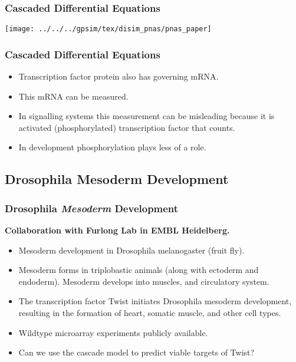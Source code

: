 \begin{frame}
  \frametitle{Cascaded Differential Equations}
  \texttt{[image: ../../../gpsim/tex/disim\_pnas/pnas\_paper]}
\end{frame}

\begin{frame}
  \frametitle{Cascaded Differential Equations}

  \begin{flushright}
    \textbf{\citep{Honkela:modelbased10}}
  \end{flushright}
  \begin{itemize}
  \item Transcription factor protein also has governing mRNA.
  \item This mRNA can be measured.
  \item In signalling systems this measurement can be misleading because it
    is activated (phosphorylated) transcription factor that counts.
  \item In development phosphorylation plays less of a role.
  \end{itemize}

\end{frame}

\subsection{Drosophila Mesoderm Development}
\begin{frame}
  \frametitle{Drosophila \emph{Mesoderm} Development}

  \textbf{Collaboration with Furlong Lab in EMBL Heidelberg.}
  \begin{itemize}
  \item Mesoderm development in Drosophila melanogaster (fruit fly).
  \item Mesoderm forms in triplobastic animals (along with ectoderm and endoderm). Mesoderm develops into muscles, and circulatory system.
  \item The transcription factor Twist initiates Drosophila mesoderm development, resulting in the formation of heart, somatic muscle, and other cell types.
  \item Wildtype microarray experiments publicly available.
  \item Can we use the cascade model to predict viable targets of Twist?
  \end{itemize}

\end{frame}


